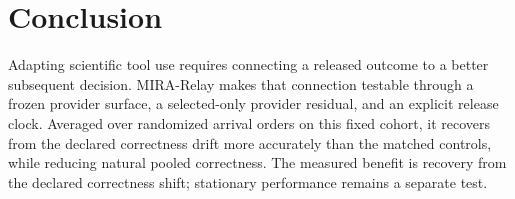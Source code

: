\documentclass[sigconf,anonymous]{aamas}
\begin{document}
\section{Conclusion}
Adapting scientific tool use requires connecting a released outcome to a better subsequent decision. MIRA-Relay makes that connection testable through a frozen provider surface, a selected-only provider residual, and an explicit release clock. Averaged over randomized arrival orders on this fixed cohort, it recovers from the declared correctness drift more accurately than the matched controls, while reducing natural pooled correctness. The measured benefit is recovery from the declared correctness shift; stationary performance remains a separate test.

\clearpage
\balance


\end{document}
